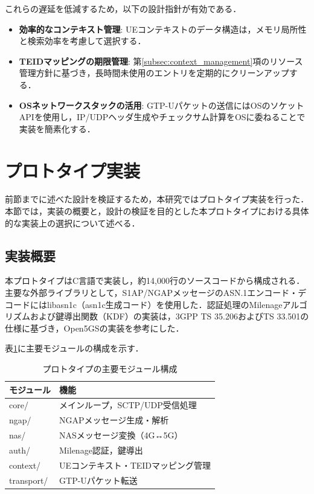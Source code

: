 これらの遅延を低減するため，以下の設計指針が有効である．
\begin{itemize}
\item \textbf{効率的なコンテキスト管理}: UEコンテキストのデータ構造は，メモリ局所性と検索効率を考慮して選択する．
\item \textbf{TEIDマッピングの期限管理}: 第\ref{subsec:context_management}項のリソース管理方針に基づき，長時間未使用のエントリを定期的にクリーンアップする．
\item \textbf{OSネットワークスタックの活用}: GTP-Uパケットの送信にはOSのソケットAPIを使用し，IP/UDPヘッダ生成やチェックサム計算をOSに委ねることで実装を簡素化する．
\end{itemize}

\section{プロトタイプ実装}
\label{sec:prototype_implementation}
前節までに述べた設計を検証するため，本研究ではプロトタイプ実装を行った．本節では，実装の概要と，設計の検証を目的とした本プロトタイプにおける具体的な実装上の選択について述べる．

\subsection{実装概要}
本プロトタイプはC言語で実装し，約14,000行のソースコードから構成される．主要な外部ライブラリとして，S1AP/NGAPメッセージのASN.1エンコード・デコードにはlibasn1c（asn1c生成コード）を使用した．認証処理のMilenageアルゴリズムおよび鍵導出関数（KDF）の実装は，3GPP TS 35.206\cite{3GPP_TS35206}およびTS 33.501\cite{3GPP_TS33501}の仕様に基づき，Open5GS\cite{open5gs}の実装を参考にした．

表\ref{tab:module_structure}に主要モジュールの構成を示す．

\begin{table}[htbp]
\centering
\caption{プロトタイプの主要モジュール構成}
\label{tab:module_structure}
\begin{tabular}{|l|l|}
\hline
\textbf{モジュール} & \textbf{機能} \\
\hline
core/ & メインループ，SCTP/UDP受信処理 \\
\hline
ngap/ & NGAPメッセージ生成・解析 \\
\hline
nas/ & NASメッセージ変換（4G↔5G） \\
\hline
auth/ & Milenage認証，鍵導出 \\
\hline
context/ & UEコンテキスト・TEIDマッピング管理 \\
\hline
transport/ & GTP-Uパケット転送 \\
\hline
\end{tabular}
\end{table}

